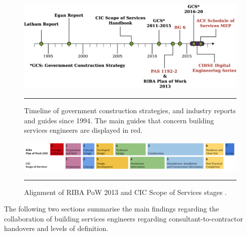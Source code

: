 \begin{figure}[htbp]
	\centering
	\includegraphics[width=\textwidth]{figures/Timeline2.eps}
	\rule{\textwidth}{0.5pt} %
	\caption[Timeline of government construction strategies, and industry reports and guides since 1994.]{Timeline of government construction strategies, and industry reports and guides since 1994. The main guides that concern building services engineers are displayed in red.}
	\label{timeline}
\end{figure}


\begin{figure}[htbp]
	\centering
	\includegraphics[width=\textwidth]{figures/PoW_Alignments.png}
	\rule{\textwidth}{0.5pt} %
	\caption[Alignment of RIBA PoW 2013 and CIC Scope of Services stages]{Alignment of RIBA PoW 2013 and CIC Scope of Services stages \citep{CIC2007, ArchitectsJournal}.}
	\label{fig_pow_alignments}
\end{figure}


The following two sections summarise the main findings regarding the collaboration of building services engineers regarding consultant-to-contractor handovers and levels of definition.

